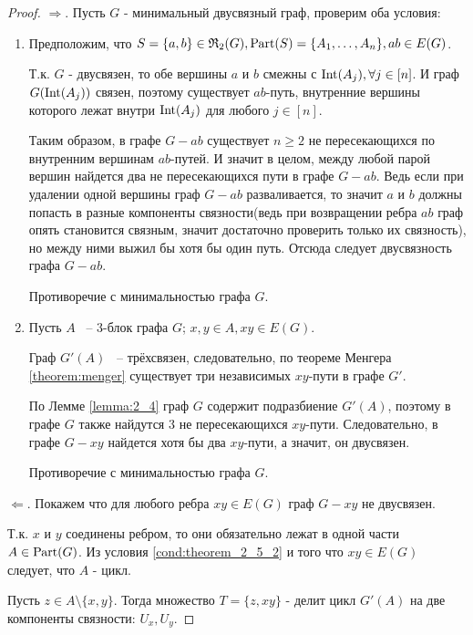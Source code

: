 \begin{proof}
	$\Longrightarrow$. Пусть  $G$ - минимальный двусвязный граф, проверим оба условия:

	\begin{enumerate}
		\item Предположим, что $S = \{a, b \} \in \mathfrak{R}_2(G), \operatorname{Part}(S) = \{A_1, \ldots, A_n\}, ab \in E(G)$.

			Т.к. $G$ - двусвязен, то обе вершины $a$ и $b$ смежны с $\operatorname{Int}(A_j), \forall j \in [n]$.
			И граф  $G(\operatorname{Int}(A_j))$ связен, поэтому существует $ab$-путь, внутренние вершины которого лежат внутри  $\operatorname{Int}(A_j)$ для любого  $j \in [n]$. 

			Таким образом, в графе $G - ab$ существует  $n \geqslant 2$ не пересекающихся по внутренним вершинам  $ab$-путей.
			И значит в целом, между любой парой вершин найдется два не пересекающихся пути в графе $G - ab$. Ведь если при удалении одной вершины граф $G - ab$ разваливается, то значит  $a$ и $b$ должны попасть в разные компоненты связности(ведь при возвращении ребра $ab$ граф опять становится связным, значит достаточно проверить только их связность), но между ними выжил бы хотя бы один путь. Отсюда следует двусвязность графа  $G - ab$.

			Противоречие с минимальностью графа  $G$.

		\item Пусть $A$ ~-- 3-блок графа $G$;  $x, y \in A, xy \in E(G)$.

			Граф  $G'(A)$ ~-- трёхсвязен, следовательно, по теореме Менгера \ref{theorem:menger} существует три независимых  $xy$-пути в графе  $G'$. 

			По Лемме \ref{lemma:2_4} граф $G$ содержит подразбиение  $G'(A)$, поэтому в графе  $G$ также найдутся 3 не пересекающихся  $xy$-пути.
			Следовательно, в графе  $G - xy$ найдется хотя бы два  $xy$-пути, а значит, он двусвязен.

			Противоречие с минимальностью графа  $G$.
	\end{enumerate}

	$\Longleftarrow$. Покажем что для любого ребра $xy \in E(G)$ граф $G - xy$ не двусвязен.

	Т.к.  $x$ и  $y$ соединены ребром, то они обязательно лежат в одной части  $A \in \operatorname{Part}(G)$.
	Из условия \eqref{cond:theorem_2_5_2} и того что $xy \in E(G)$  следует, что  $A$ - цикл. 

	Пусть $z \in A \setminus \{x, y\}$.
	Тогда множество $T = \{z, xy\}$ - делит цикл $G'(A)$ на две компоненты связности:  $U_x, U_y$.


\end{proof}
